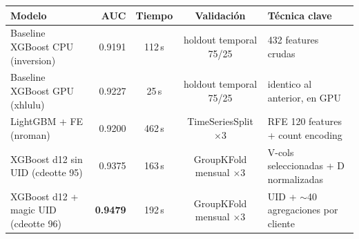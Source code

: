 \begin{tabular}{lrccl}
\toprule
Modelo & AUC & Tiempo & Validación & Técnica clave \\
\midrule
Baseline XGBoost CPU (inversion) & 0.9191 & 112\,s & holdout temporal 75/25 & 432 features crudas \\
Baseline XGBoost GPU (xhlulu) & 0.9227 & 25\,s & holdout temporal 75/25 & identico al anterior, en GPU \\
LightGBM + FE (nroman) & 0.9200 & 462\,s & TimeSeriesSplit $\times$3 & RFE 120 features + count encoding \\
XGBoost d12 sin UID (cdeotte 95) & 0.9375 & 163\,s & GroupKFold mensual $\times$3 & V-cols seleccionadas + D normalizadas \\
XGBoost d12 + magic UID (cdeotte 96) & \textbf{0.9479} & 192\,s & GroupKFold mensual $\times$3 & UID + $\sim$40 agregaciones por cliente \\
\bottomrule
\end{tabular}